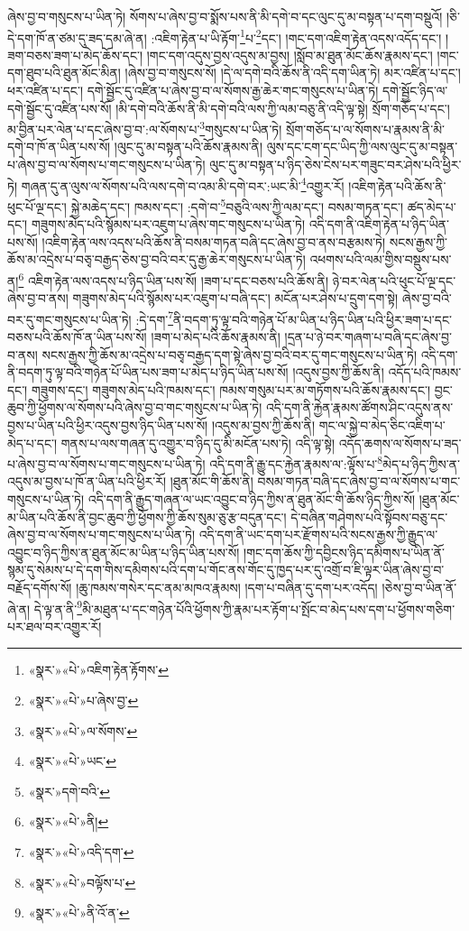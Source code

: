 ཞེས་བྱ་བ་གསུངས་པ་ཡིན་ཏེ། སོགས་པ་ཞེས་བྱ་བ་སྨོས་པས་ནི་མི་དགེ་བ་དང་ལུང་དུ་མ་བསྟན་པ་དག་བསྡུའོ། །ཅི་དེ་དག་ཁོ་ན་ཙམ་དུ་ཟད་དམ་ཞེ་ན། :འཇིག་རྟེན་པ་ཡི་རྟོག་\footnote{«སྣར་»«པེ་»འཇིག་རྟེན་རྟོགས་}པ་\footnote{«སྣར་»«པེ་»པ་ཞེས་བྱ་}དང་། །གང་དག་འཇིག་རྟེན་འདས་འདོད་དང་། །ཟག་བཅས་ཟག་པ་མེད་ཆོས་དང་། །གང་དག་འདུས་བྱས་འདུས་མ་བྱས། །སློབ་མ་ཐུན་མོང་ཆོས་རྣམས་དང་། །གང་དག་ཐུབ་པའི་ཐུན་མོང་མིན། །ཞེས་བྱ་བ་གསུངས་སོ། །དེ་ལ་དགེ་བའི་ཆོས་ནི་འདི་དག་ཡིན་ཏེ། མར་འཛིན་པ་དང་། ཕར་འཛིན་པ་དང་། དགེ་སྦྱོང་དུ་འཛིན་པ་ཞེས་བྱ་བ་ལ་སོགས་རྒྱ་ཆེར་གང་གསུངས་པ་ཡིན་ཏེ། དགེ་སྦྱོང་ཉིད་ལ་དགེ་སྦྱོང་དུ་འཛིན་པས་སོ། །མི་དགེ་བའི་ཆོས་ནི་མི་དགེ་བའི་ལས་ཀྱི་ལམ་བཅུ་ནི་འདི་ལྟ་སྟེ། སྲོག་གཅོད་པ་དང་། མ་བྱིན་པར་ལེན་པ་དང་ཞེས་བྱ་བ་:ལ་སོགས་པ་\footnote{«སྣར་»«པེ་»ལ་སོགས་}གསུངས་པ་ཡིན་ཏེ། སྲོག་གཅོད་པ་ལ་སོགས་པ་རྣམས་ནི་མི་དགེ་བ་ཁོ་ན་ཡིན་པས་སོ། །ལུང་དུ་མ་བསྟན་པའི་ཆོས་རྣམས་ནི། ལུས་དང་ངག་དང་ཡིད་ཀྱི་ལས་ལུང་དུ་མ་བསྟན་པ་ཞེས་བྱ་བ་ལ་སོགས་པ་གང་གསུངས་པ་ཡིན་ཏེ། ལུང་དུ་མ་བསྟན་པ་ཉིད་ཅེས་ངེས་པར་གཟུང་བར་ཤེས་པའི་ཕྱིར་ཏེ། གཞན་དུ་ན་ལུས་ལ་སོགས་པའི་ལས་དགེ་བ་འམ་མི་དགེ་བར་:ཡང་མི་\footnote{«སྣར་»«པེ་»ཡང་}འགྱུར་རོ། །འཇིག་རྟེན་པའི་ཆོས་ནི་ཕུང་པོ་ལྔ་དང་། སྐྱེ་མཆེད་དང་། ཁམས་དང་། :དགེ་བ་\footnote{«སྣར་»དགེ་བའི་}བཅུའི་ལས་ཀྱི་ལམ་དང་། བསམ་གཏན་དང་། ཚད་མེད་པ་དང་། གཟུགས་མེད་པའི་སྙོམས་པར་འཇུག་པ་ཞེས་གང་གསུངས་པ་ཡིན་ཏེ། འདི་དག་ནི་འཇིག་རྟེན་པ་ཉིད་ཡིན་པས་སོ། །འཇིག་རྟེན་ལས་འདས་པའི་ཆོས་ནི་བསམ་གཏན་བཞི་དང་ཞེས་བྱ་བ་ནས་བརྩམས་ཏེ། སངས་རྒྱས་ཀྱི་ཆོས་མ་འདྲེས་པ་བཅྭ་བརྒྱད་ཅེས་བྱ་བའི་བར་དུ་རྒྱ་ཆེར་གསུངས་པ་ཡིན་ཏེ། འཕགས་པའི་ལམ་གྱིས་བསྡུས་པས་ན།\footnote{«སྣར་»«པེ་»ནི།} འཇིག་རྟེན་ལས་འདས་པ་ཉིད་ཡིན་པས་སོ། །ཟག་པ་དང་བཅས་པའི་ཆོས་ནི། ཉེ་བར་ལེན་པའི་ཕུང་པོ་ལྔ་དང་ཞེས་བྱ་བ་ནས། གཟུགས་མེད་པའི་སྙོམས་པར་འཇུག་པ་བཞི་དང་། མངོན་པར་ཤེས་པ་དྲུག་དག་སྟེ། ཞེས་བྱ་བའི་བར་དུ་གང་གསུངས་པ་ཡིན་ཏེ། :དེ་དག་\footnote{«སྣར་»«པེ་»འདི་དག་}ནི་བདག་ཏུ་ལྟ་བའི་གཉེན་པོ་མ་ཡིན་པ་ཉིད་ཡིན་པའི་ཕྱིར་ཟག་པ་དང་བཅས་པའི་ཆོས་ཁོ་ན་ཡིན་པས་སོ། །ཟག་པ་མེད་པའི་ཆོས་རྣམས་ནི། །དྲན་པ་ཉེ་བར་གཞག་པ་བཞི་དང་ཞེས་བྱ་བ་ནས། སངས་རྒྱས་ཀྱི་ཆོས་མ་འདྲེས་པ་བཅྭ་བརྒྱད་དག་སྟེ་ཞེས་བྱ་བའི་བར་དུ་གང་གསུངས་པ་ཡིན་ཏེ། འདི་དག་ནི་བདག་ཏུ་ལྟ་བའི་གཉེན་པོ་ཡིན་པས་ཟག་པ་མེད་པ་ཉིད་ཡིན་པས་སོ། །འདུས་བྱས་ཀྱི་ཆོས་ནི། འདོད་པའི་ཁམས་དང་། གཟུགས་དང་། གཟུགས་མེད་པའི་ཁམས་དང་། ཁམས་གསུམ་པར་མ་གཏོགས་པའི་ཆོས་རྣམས་དང་། བྱང་ཆུབ་ཀྱི་ཕྱོགས་ལ་སོགས་པའི་ཞེས་བྱ་བ་གང་གསུངས་པ་ཡིན་ཏེ། འདི་དག་ནི་རྐྱེན་རྣམས་ཚོགས་ཤིང་འདུས་ནས་བྱས་པ་ཡིན་པའི་ཕྱིར་འདུས་བྱས་ཉིད་ཡིན་པས་སོ། །འདུས་མ་བྱས་ཀྱི་ཆོས་ནི། གང་ལ་སྐྱེ་བ་མེད་ཅིང་འཇིག་པ་མེད་པ་དང་། གནས་པ་ལས་གཞན་དུ་འགྱུར་བ་ཉིད་དུ་མི་མངོན་པས་ཏེ། འདི་ལྟ་སྟེ། འདོད་ཆགས་ལ་སོགས་པ་ཟད་པ་ཞེས་བྱ་བ་ལ་སོགས་པ་གང་གསུངས་པ་ཡིན་ཏེ། འདི་དག་ནི་རྒྱུ་དང་རྐྱེན་རྣམས་ལ་:ལྟོས་པ་\footnote{«སྣར་»«པེ་»བལྟོས་པ་}མེད་པ་ཉིད་ཀྱིས་ན་འདུས་མ་བྱས་པ་ཁོ་ན་ཡིན་པའི་ཕྱིར་རོ། །ཐུན་མོང་གི་ཆོས་ནི། བསམ་གཏན་བཞི་དང་ཞེས་བྱ་བ་ལ་སོགས་པ་གང་གསུངས་པ་ཡིན་ཏེ། འདི་དག་ནི་རྒྱུད་གཞན་ལ་ཡང་འབྱུང་བ་ཉིད་ཀྱིས་ན་ཐུན་མོང་གི་ཆོས་ཉིད་ཀྱིས་སོ། །ཐུན་མོང་མ་ཡིན་པའི་ཆོས་ནི་བྱང་ཆུབ་ཀྱི་ཕྱོགས་ཀྱི་ཆོས་སུམ་ཅུ་རྩ་བདུན་དང་། དེ་བཞིན་གཤེགས་པའི་སྟོབས་བཅུ་དང་ཞེས་བྱ་བ་ལ་སོགས་པ་གང་གསུངས་པ་ཡིན་ཏེ། འདི་དག་ནི་ཡང་དག་པར་རྫོགས་པའི་སངས་རྒྱས་ཀྱི་རྒྱུད་ལ་འབྱུང་བ་ཉིད་ཀྱིས་ན་ཐུན་མོང་མ་ཡིན་པ་ཉིད་ཡིན་པས་སོ། །གང་དག་ཆོས་ཀྱི་དབྱིངས་ཉིད་དམིགས་པ་ཡིན་ནོ་སྙམ་དུ་སེམས་པ་དེ་དག་གིས་དམིགས་པའི་དག་པ་གོང་ནས་གོང་དུ་ཁྱད་པར་དུ་འགྲོ་བ་ཇི་ལྟར་ཡིན་ཞེས་བྱ་བ་བརྗོད་དགོས་སོ། །ཆུ་ཁམས་གསེར་དང་ནམ་མཁའ་རྣམས། །དག་པ་བཞིན་དུ་དག་པར་འདོད། །ཅེས་བྱ་བ་ཡིན་ནོ་ཞེ་ན། དེ་ལྟ་ན་ནི་\footnote{«སྣར་»«པེ་»ནི་འོ་ན་}མི་མཐུན་པ་དང་གཉེན་པོའི་ཕྱོགས་ཀྱི་རྣམ་པར་རྟོག་པ་སྤོང་བ་མེད་པས་དག་པ་ཕྱོགས་གཅིག་པར་ཐལ་བར་འགྱུར་རོ། 